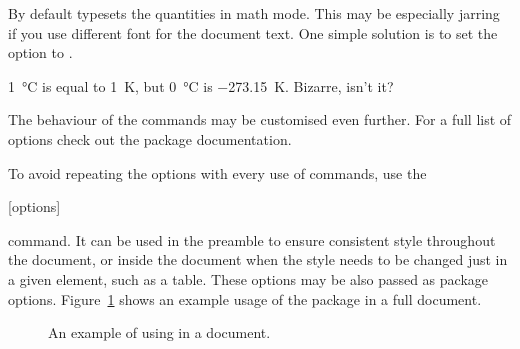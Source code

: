 By default  typesets the quantities in math mode. This may be
especially jarring if you use different font for the document text. One simple
solution is to set the  option to .
\begin{example}[examplewidth=0.4\linewidth]
\setmainfont{SourceSansPro-Regular.otf} %
\qty{1}{\degreeCelsius} is
equal to \qty{1}{\kelvin}, but
\qty[mode = text]{0}{\degreeCelsius}
is \qty[mode = text]{-273.15}{\kelvin}.
Bizarre, isn't it?
\end{example}

The behaviour of the commands may be customised even further. For a full list
of options check out the  package documentation.

To avoid repeating the options with every use of commands, use the
\begin{lscommand}
  [options]
\end{lscommand}
command. It can be used in the preamble to ensure consistent style throughout
the document, or inside the document when the style needs to be changed just
in a given element, such as a table. These options may be also passed as package
options. Figure~\ref{sistandaloneexa} shows an example usage of the package in
a full document.
\begin{figure}[htp]
  \caption{An example of using  in a document.}%
  \label{sistandaloneexa}
\end{figure}

